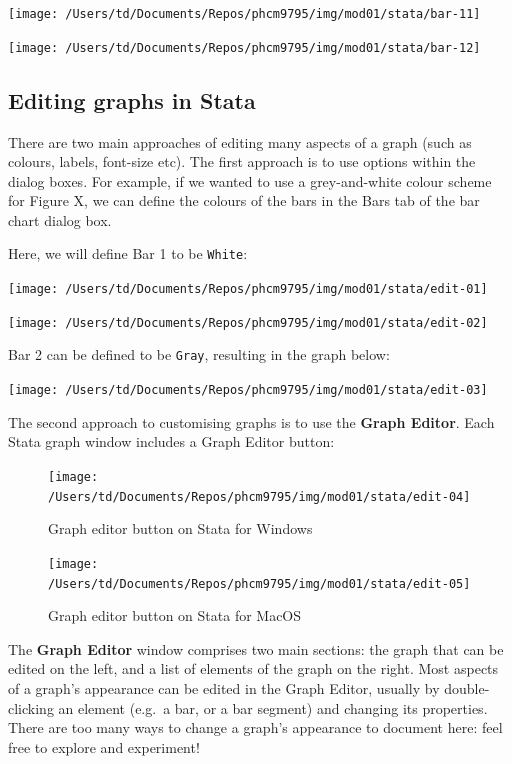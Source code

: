 \documentclass[
]{memoir}
\begin{document}
\texttt{[image: /Users/td/Documents/Repos/phcm9795/img/mod01/stata/bar-11]}

\texttt{[image: /Users/td/Documents/Repos/phcm9795/img/mod01/stata/bar-12]}

\hypertarget{editing-graphs-in-stata}{%
\subsection{Editing graphs in Stata}\label{editing-graphs-in-stata}}

There are two main approaches of editing many aspects of a graph (such as colours, labels, font-size etc). The first approach is to use options within the dialog boxes. For example, if we wanted to use a grey-and-white colour scheme for Figure X, we can define the colours of the bars in the Bars tab of the bar chart dialog box.

Here, we will define Bar 1 to be \texttt{White}:

\texttt{[image: /Users/td/Documents/Repos/phcm9795/img/mod01/stata/edit-01]}

\texttt{[image: /Users/td/Documents/Repos/phcm9795/img/mod01/stata/edit-02]}

Bar 2 can be defined to be \texttt{Gray}, resulting in the graph below:

\texttt{[image: /Users/td/Documents/Repos/phcm9795/img/mod01/stata/edit-03]}

The second approach to customising graphs is to use the \textbf{Graph Editor}. Each Stata graph window includes a Graph Editor button:

\begin{figure}
\texttt{[image: /Users/td/Documents/Repos/phcm9795/img/mod01/stata/edit-04]} \caption{Graph editor button on Stata for Windows}\label{fig:unnamed-chunk-41}
\end{figure}

\begin{figure}
\texttt{[image: /Users/td/Documents/Repos/phcm9795/img/mod01/stata/edit-05]} \caption{Graph editor button on Stata for MacOS}\label{fig:unnamed-chunk-42}
\end{figure}

The \textbf{Graph Editor} window comprises two main sections: the graph that can be edited on the left, and a list of elements of the graph on the right. Most aspects of a graph's appearance can be edited in the Graph Editor, usually by double-clicking an element (e.g.~a bar, or a bar segment) and changing its properties. There are too many ways to change a graph's appearance to document here: feel free to explore and experiment!
\end{document}
